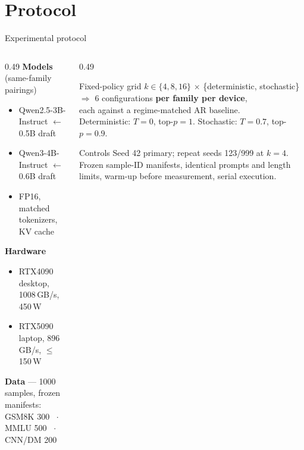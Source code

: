 \documentclass[aspectratio=169, 11pt]{beamer}
\begin{document}
\section{Protocol}

\begin{frame}{Experimental protocol}
  \begin{columns}[T,onlytextwidth]
    \begin{column}{0.49\textwidth}
      \small
      \textbf{Models} (same-family pairings)
      \begin{itemize}\itemsep0pt
        \item Qwen2.5-3B-Instruct $\leftarrow$ 0.5B draft
        \item Qwen3-4B-Instruct $\leftarrow$ 0.6B draft
        \item FP16, matched tokenizers, KV cache
      \end{itemize}
      \vspace{3pt}
      \textbf{Hardware}
      \begin{itemize}\itemsep0pt
        \item RTX4090 desktop, 1008\,GB/s, 450\,W
        \item RTX5090 laptop, 896\,GB/s, $\leq$150\,W
      \end{itemize}
      \vspace{3pt}
      \textbf{Data} --- 1000 samples, frozen manifests:\\
      GSM8K 300 \, $\cdot$ \, MMLU 500 \, $\cdot$ \, CNN/DM 200
    \end{column}
    \begin{column}{0.49\textwidth}
      \begin{block}{Fixed-policy grid}
        \small
        $k \in \{4, 8, 16\}$ $\times$ \{deterministic, stochastic\}\\
        $\Rightarrow$ 6 configurations \textbf{per family per device},\\
        each against a \alert{regime-matched} AR baseline.
        \\[3pt]
        Deterministic: $T{=}0$, top-$p{=}1$.\quad
        Stochastic: $T{=}0.7$, top-$p{=}0.9$.
      \end{block}
      \begin{block}{Controls}
        \small
        Seed 42 primary; repeat seeds 123/999 at $k{=}4$.
        Frozen sample-ID manifests, identical prompts and length limits,
        warm-up before measurement, serial execution.
      \end{block}
    \end{column}
  \end{columns}
\end{frame}
\end{document}
